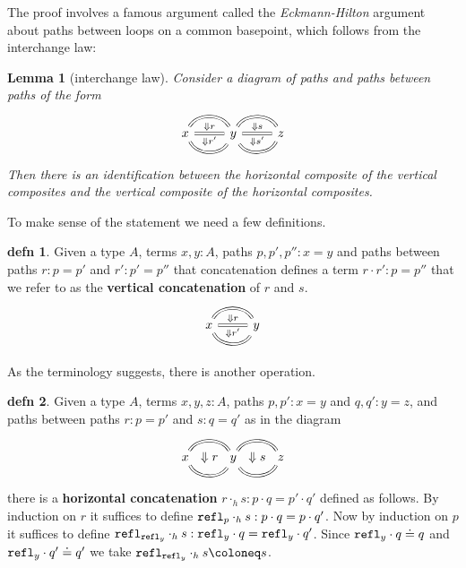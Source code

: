 \documentclass{amsart}
\theoremstyle{theorem}
\newtheorem*{lem}{Lemma}
\theoremstyle{definition}
\newtheorem*{defn}{defn}
\theoremstyle{remark}
\newcommand{\0}{\mathbbe{0}}
\newcommand{\1}{\mathbbe{1}}
\newcommand{\2}{\mathbbe{2}}
\newcommand{\3}{\mathbbe{3}}
\newcommand{\4}{\mathbbe{4}}
\newcommand{\term}[1]{{\textup{\texttt{#1}}}}
\newcommand{\refl}{\term{refl}}
\begin{document}
The proof involves a famous argument called the \emph{Eckmann-Hilton} argument about paths between loops on a common basepoint, which follows from the interchange law:

\begin{lem}[interchange law] Consider a diagram of paths and paths between paths of the form
\[
\begin{tikzcd}
x \arrow[r, bend left=60, equals] \arrow[r, equals, "{\Downarrow r}", "{\Downarrow r'}"'] \arrow[r, bend right=60, equals] & y \arrow[r, bend left=60, equals] \arrow[r, equals, "{\Downarrow s}", "{\Downarrow s'}"'] \arrow[r, bend right=60, equals] & z
\end{tikzcd}
\]
Then there is an identification between the horizontal composite of the vertical composites and the vertical composite of the horizontal composites.
\end{lem}

To make sense of the statement we need a few definitions.

\begin{defn} Given a type $A$, terms $x,y : A$, paths $p, p', p'' : x = y$ and paths between paths $r : p = p'$ and $r' : p' = p''$ that concatenation defines a term $r \cdot r' : p = p''$ that we refer to as the \textbf{vertical concatenation} of $r$ and $s$.
\[
\begin{tikzcd}
x \arrow[r, bend left=60, equals] \arrow[r, equals, "{\Downarrow r}", "{\Downarrow r'}"'] \arrow[r, bend right=60, equals] & y 
\end{tikzcd}
\]
\end{defn}

As the terminology suggests, there is another operation.

\begin{defn} Given a type $A$, terms $x,y,z: A$, paths $p, p' : x = y$ and $q, q' : y = z$, and paths between paths $r : p = p'$ and $s : q = q'$ as in the diagram
\[
\begin{tikzcd}
x \arrow[r, bend left=60, equals] \arrow[r, phantom, "{\Downarrow r}"] \arrow[r, bend right=60, equals] & y \arrow[r, bend left=60, equals] \arrow[r, phantom, "{\Downarrow s}"] \arrow[r, bend right=60, equals] & z
\end{tikzcd}
\]
there is a \textbf{horizontal concatenation} $r \cdot_h s : p \cdot q = p' \cdot q'$ defined as follows. By induction on $r$ it suffices to define $\refl_p \cdot_h s : p \cdot q = p \cdot q'$. Now by induction on $p$ it suffices to define $\refl_{\refl_y} \cdot_h s : \refl_y \cdot q = \refl_y \cdot q'$. Since $\refl_y \cdot q \doteq q$ and $\refl_y \cdot q' \doteq q'$ we take $\refl_{\refl_y} \cdot_h s \coloneq s$.
\end{defn}
\end{document}
